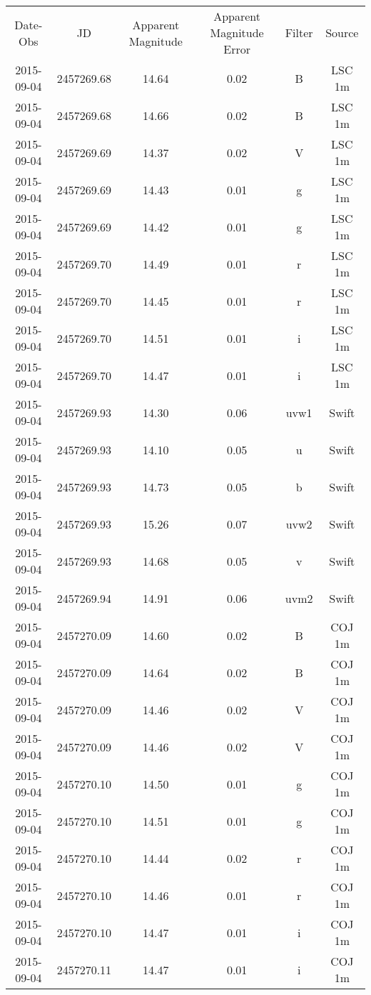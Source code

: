 \begin{table}
\begin{tabular}{cccccc}
Date-Obs & JD & Apparent Magnitude & Apparent Magnitude Error & Filter & Source \\
2015-09-04 & 2457269.68 & 14.64 & 0.02 & B & LSC 1m \\
2015-09-04 & 2457269.68 & 14.66 & 0.02 & B & LSC 1m \\
2015-09-04 & 2457269.69 & 14.37 & 0.02 & V & LSC 1m \\
2015-09-04 & 2457269.69 & 14.43 & 0.01 & g & LSC 1m \\
2015-09-04 & 2457269.69 & 14.42 & 0.01 & g & LSC 1m \\
2015-09-04 & 2457269.70 & 14.49 & 0.01 & r & LSC 1m \\
2015-09-04 & 2457269.70 & 14.45 & 0.01 & r & LSC 1m \\
2015-09-04 & 2457269.70 & 14.51 & 0.01 & i & LSC 1m \\
2015-09-04 & 2457269.70 & 14.47 & 0.01 & i & LSC 1m \\
2015-09-04 & 2457269.93 & 14.30 & 0.06 & uvw1 & Swift \\
2015-09-04 & 2457269.93 & 14.10 & 0.05 & u & Swift \\
2015-09-04 & 2457269.93 & 14.73 & 0.05 & b & Swift \\
2015-09-04 & 2457269.93 & 15.26 & 0.07 & uvw2 & Swift \\
2015-09-04 & 2457269.93 & 14.68 & 0.05 & v & Swift \\
2015-09-04 & 2457269.94 & 14.91 & 0.06 & uvm2 & Swift \\
2015-09-04 & 2457270.09 & 14.60 & 0.02 & B & COJ 1m \\
2015-09-04 & 2457270.09 & 14.64 & 0.02 & B & COJ 1m \\
2015-09-04 & 2457270.09 & 14.46 & 0.02 & V & COJ 1m \\
2015-09-04 & 2457270.09 & 14.46 & 0.02 & V & COJ 1m \\
2015-09-04 & 2457270.10 & 14.50 & 0.01 & g & COJ 1m \\
2015-09-04 & 2457270.10 & 14.51 & 0.01 & g & COJ 1m \\
2015-09-04 & 2457270.10 & 14.44 & 0.02 & r & COJ 1m \\
2015-09-04 & 2457270.10 & 14.46 & 0.01 & r & COJ 1m \\
2015-09-04 & 2457270.10 & 14.47 & 0.01 & i & COJ 1m \\
2015-09-04 & 2457270.11 & 14.47 & 0.01 & i & COJ 1m \\

\end{tabular}
\end{table}
